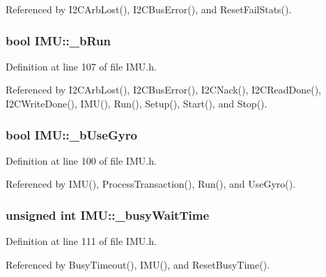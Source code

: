 Referenced by I2CArbLost(), I2CBusError(), and ResetFailStats().

\hypertarget{class_i_m_u_a547fe1fb8adb34917aa08663919b97df}{
\subsubsection[{\_\-bRun}]{\setlength{\rightskip}{0pt plus 5cm}bool {\bf IMU::\_\-bRun}}}
\label{class_i_m_u_a547fe1fb8adb34917aa08663919b97df}


Definition at line 107 of file IMU.h.



Referenced by I2CArbLost(), I2CBusError(), I2CNack(), I2CReadDone(), I2CWriteDone(), IMU(), Run(), Setup(), Start(), and Stop().

\hypertarget{class_i_m_u_a0cee90ebd5d0b57fa5ad3890c65108e2}{
\subsubsection[{\_\-bUseGyro}]{\setlength{\rightskip}{0pt plus 5cm}bool {\bf IMU::\_\-bUseGyro}}}
\label{class_i_m_u_a0cee90ebd5d0b57fa5ad3890c65108e2}


Definition at line 100 of file IMU.h.



Referenced by IMU(), ProcessTransaction(), Run(), and UseGyro().

\hypertarget{class_i_m_u_adce31ce2a3317918d73b47e94a2d9227}{
\subsubsection[{\_\-busyWaitTime}]{\setlength{\rightskip}{0pt plus 5cm}unsigned int {\bf IMU::\_\-busyWaitTime}}}
\label{class_i_m_u_adce31ce2a3317918d73b47e94a2d9227}


Definition at line 111 of file IMU.h.



Referenced by BusyTimeout(), IMU(), and ResetBusyTime().

